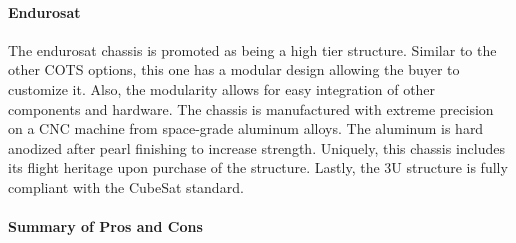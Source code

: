 \documentclass{ece}
\begin{document}
\paragraph{Endurosat}
The endurosat chassis is promoted as being a high tier structure. Similar to the other COTS options, this one has a modular design allowing the buyer to customize it. Also, the modularity allows for easy integration of other components and hardware. The chassis is manufactured with extreme precision on a CNC machine from space-grade aluminum alloys. The aluminum is hard anodized after pearl finishing to increase strength. Uniquely, this chassis includes its flight heritage upon purchase of the structure. Lastly, the 3U structure is fully compliant with the CubeSat standard.\cite{enduro_sat} 

\paragraph{Summary of Pros and Cons}
\end{document}
